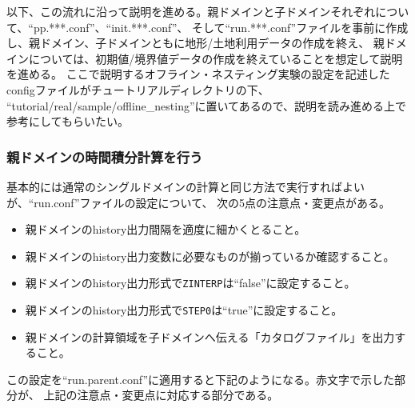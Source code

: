 以下、この流れに沿って説明を進める。親ドメインと子ドメインそれぞれについて、``pp.***.conf''、``init.***.conf''、
そして``run.***.conf''ファイルを事前に作成し、親ドメイン、子ドメインともに地形/土地利用データの作成を終え、
親ドメインについては、初期値/境界値データの作成を終えていることを想定して説明を進める。
ここで説明するオフライン・ネスティング実験の設定を記述したconfigファイルがチュートリアルディレクトリの下、
``tutorial/real/sample/offline\_nesting''に置いてあるので、説明を読み進める上で参考にしてもらいたい。

\subsubsection{親ドメインの時間積分計算を行う}
基本的には通常のシングルドメインの計算と同じ方法で実行すればよいが、``run.conf''ファイルの設定について、
次の5点の注意点・変更点がある。

\begin{itemize}
 \item 親ドメインのhistory出力間隔を適度に細かくとること。
 \item 親ドメインのhistory出力変数に必要なものが揃っているか確認すること。
 \item 親ドメインのhistory出力形式で\verb|ZINTERP|は``false''に設定すること。
 \item 親ドメインのhistory出力形式で\verb|STEP0|は``true''に設定すること。
 \item 親ドメインの計算領域を子ドメインへ伝える「カタログファイル」を出力すること。
\end{itemize}


この設定を``run.parent.conf''に適用すると下記のようになる。赤文字で示した部分が、
上記の注意点・変更点に対応する部分である。\\

\\

